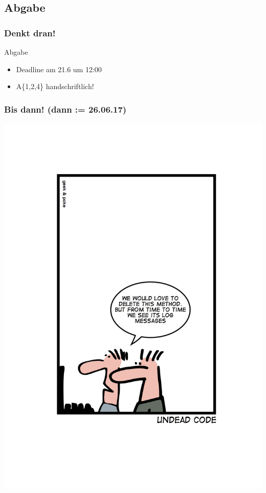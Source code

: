 \documentclass[18pt]{beamer}
\begin{document}
	\subsection{Abgabe}
	\begin{frame}
		\frametitle{Denkt dran!}
		\begin{alertblock}{Abgabe}
			\begin{itemize}
				\item Deadline am 21.6 um 12:00
				\item A\{1,2,4\} handschriftlich!
			\end{itemize}
		\end{alertblock}
	\end{frame}
		
	\begin{frame}
		\frametitle{Bis dann! (dann  := 26.06.17)}
		\centering
		\includegraphics[scale=0.5]{./comics/geek_and_poke_undeadCode.jpg}
	\end{frame}
\end{document}
